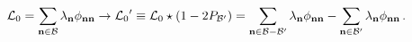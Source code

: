 \begin{equation}
{\mathcal{L}_{0}}=\sum_{\mathbf{n}\in \mathcal{B}}\lambda _{\mathbf{n}}\phi
_{\mathbf{nn}}\rightarrow {\mathcal{L}_{0}}^{\prime }\equiv {\mathcal{L}_{0}}%
\star (1-2P_{\mathcal{B}^{\prime }})=\sum_{\mathbf{n}\in \mathcal{B}-%
\mathcal{B}^{\prime }}\lambda _{\mathbf{n}}\phi _{\mathbf{nn}}-\sum_{\mathbf{%
n}\in \mathcal{B}^{\prime }}\lambda _{\mathbf{n}}\phi _{\mathbf{nn}}\,.
\end{equation}%
